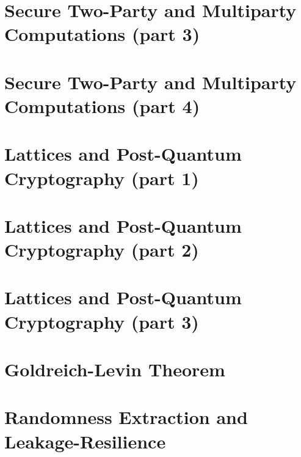 \documentclass{llncs}
\begin{document}
\section{Secure Two-Party and Multiparty Computations (part 3)}

\section{Secure Two-Party and Multiparty Computations (part 4)}

\section{Lattices and Post-Quantum Cryptography (part 1)}

\section{Lattices and Post-Quantum Cryptography (part 2)}

\section{Lattices and Post-Quantum Cryptography (part 3)}

\section{Goldreich-Levin Theorem}

\section{Randomness Extraction and Leakage-Resilience}


\printbibliography %
\end{document}
